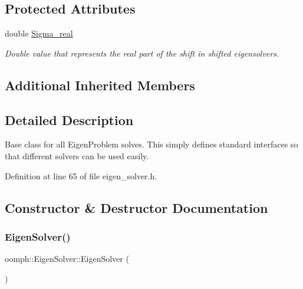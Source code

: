 \subsection*{Protected Attributes}
\begin{DoxyCompactItemize}
\item 
double \hyperlink{classoomph_1_1EigenSolver_ab0ead9f50f12f8d6acf9be4521de95a1}{Sigma\+\_\+real}
\begin{DoxyCompactList}\small\item\em Double value that represents the real part of the shift in shifted eigensolvers. \end{DoxyCompactList}\end{DoxyCompactItemize}
\subsection*{Additional Inherited Members}


\subsection{Detailed Description}
Base class for all Eigen\+Problem solves. This simply defines standard interfaces so that different solvers can be used easily. 

Definition at line 65 of file eigen\+\_\+solver.\+h.



\subsection{Constructor \& Destructor Documentation}
\mbox{\label{classoomph_1_1EigenSolver_a677b40c853c649f87b52815a6fadb2c6}} 
\subsubsection{\texorpdfstring{Eigen\+Solver()}{EigenSolver()}\hspace{0.1cm}{\footnotesize\ttfamily [1/2]}}
{\footnotesize\ttfamily oomph\+::\+Eigen\+Solver\+::\+Eigen\+Solver (\begin{DoxyParamCaption}{ }\end{DoxyParamCaption})\hspace{0.3cm}{\ttfamily [inline]}}



